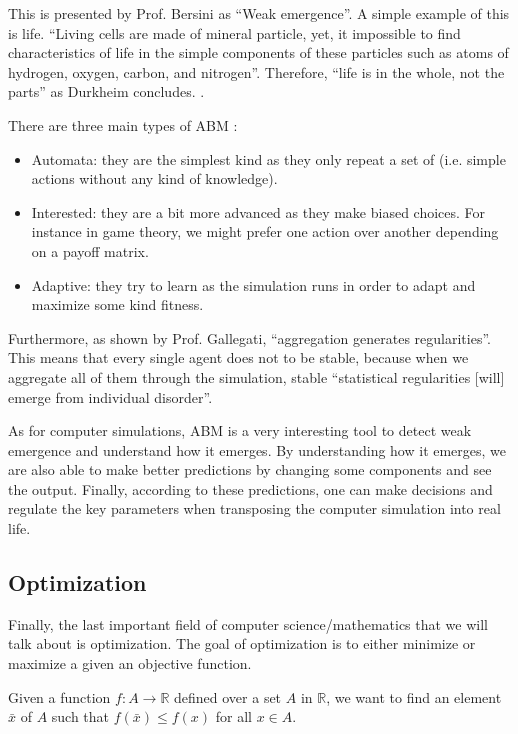    This is presented by Prof. Bersini as ``Weak emergence''.\cite{ctaiABMBersini} A simple example of this is life. ``Living cells are made of mineral particle, yet, it impossible to find characteristics of life in the simple components of these particles such as atoms of hydrogen, oxygen, carbon, and nitrogen''. Therefore, ``life is in the whole, not the parts'' as Durkheim concludes. \cite{ctaiABMBersini}.

    There are three main types of ABM \cite{ctaiABMBersini} :

    \begin{itemize}
        \item Automata: they are the simplest kind as they only repeat a set of (i.e. simple actions without any kind of knowledge). 
        \item Interested: they are a bit more advanced as they make biased choices. For instance in game theory, we might prefer one action over another depending on a payoff matrix.
        \item Adaptive: they try to learn as the simulation runs in order to adapt and maximize some kind fitness.
    \end{itemize}

    Furthermore, as shown by Prof. Gallegati, ``aggregation generates regularities''. This means that every single agent does not to be stable, because when we aggregate all of them through the simulation, stable ``statistical regularities [will] emerge from individual disorder''. \cite{MauroGallegati}

    As for computer simulations, ABM is a very interesting tool to detect weak emergence and understand how it emerges. By understanding how it emerges, we are also able to make better predictions by changing some components and see the output. Finally, according to these predictions, one can make decisions and regulate the key parameters when transposing the computer simulation into real life. \cite{ctaiABMBersini}

\subsection{Optimization}

    Finally, the last important field of computer science/mathematics that we will talk about is optimization. The goal of optimization is to either minimize or maximize a given an objective function. 

    Given a function $f : A \rightarrow \mathbb{R}$ defined over a set $A$ in $\mathbb{R}$, we want to find an element $\bar{x} $ of $A$ such that $f(\bar{x}) \leq f(x)$ for all $x \in A$.

